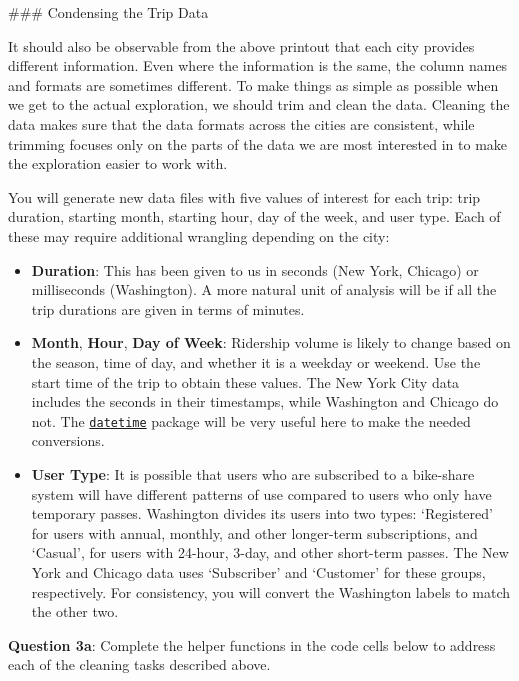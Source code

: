\documentclass[11pt]{article}
\providecommand{\tightlist}{%
      \setlength{\itemsep}{0pt}\setlength{\parskip}{0pt}}
\begin{document}
 \#\#\# Condensing the Trip Data

It should also be observable from the above printout that each city
provides different information. Even where the information is the same,
the column names and formats are sometimes different. To make things as
simple as possible when we get to the actual exploration, we should trim
and clean the data. Cleaning the data makes sure that the data formats
across the cities are consistent, while trimming focuses only on the
parts of the data we are most interested in to make the exploration
easier to work with.

You will generate new data files with five values of interest for each
trip: trip duration, starting month, starting hour, day of the week, and
user type. Each of these may require additional wrangling depending on
the city:

\begin{itemize}
\tightlist
\item
  \textbf{Duration}: This has been given to us in seconds (New York,
  Chicago) or milliseconds (Washington). A more natural unit of analysis
  will be if all the trip durations are given in terms of minutes.
\item
  \textbf{Month}, \textbf{Hour}, \textbf{Day of Week}: Ridership volume
  is likely to change based on the season, time of day, and whether it
  is a weekday or weekend. Use the start time of the trip to obtain
  these values. The New York City data includes the seconds in their
  timestamps, while Washington and Chicago do not. The
  \href{https://docs.python.org/3/library/datetime.html}{\texttt{datetime}}
  package will be very useful here to make the needed conversions.
\item
  \textbf{User Type}: It is possible that users who are subscribed to a
  bike-share system will have different patterns of use compared to
  users who only have temporary passes. Washington divides its users
  into two types: `Registered' for users with annual, monthly, and other
  longer-term subscriptions, and `Casual', for users with 24-hour,
  3-day, and other short-term passes. The New York and Chicago data uses
  `Subscriber' and `Customer' for these groups, respectively. For
  consistency, you will convert the Washington labels to match the other
  two.
\end{itemize}

\textbf{Question 3a}: Complete the helper functions in the code cells
below to address each of the cleaning tasks described above.
\end{document}
